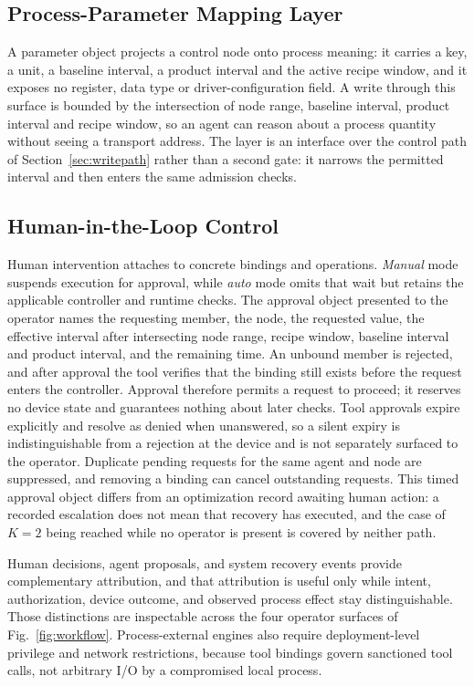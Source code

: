 \subsection{Process-Parameter Mapping Layer}
\label{sec:paramlayer}
A parameter object projects a control node onto process meaning: it carries a key, a
unit, a baseline interval, a product interval and the active recipe window, and it
exposes no register, data type or driver-configuration field. A write through this surface is bounded by the intersection of node range, baseline interval, product interval and recipe window, so an agent can
reason about a process quantity without seeing a transport address. The layer is an
interface over the control path of Section~\ref{sec:writepath} rather than a second
gate: it narrows the permitted interval and then enters the same admission checks.

\subsection{Human-in-the-Loop Control}
\label{sec:hitl}
Human intervention attaches to concrete bindings and operations. \emph{Manual} mode
suspends execution for approval, while \emph{auto} mode omits that wait but retains
the applicable controller and runtime checks. The approval object presented to the
operator names the requesting member, the node, the requested value, the effective
interval after intersecting node range, recipe window, baseline interval and
product interval, and the remaining time. An unbound member is rejected, and
after approval the tool verifies that the binding still exists before the request
enters the controller. Approval therefore permits a request to proceed; it reserves
no device state and guarantees nothing about later checks. Tool approvals expire
explicitly and resolve as denied when unanswered, so a silent expiry is
indistinguishable from a rejection at the device and is not separately surfaced to
the operator. Duplicate pending requests for the same agent and node are
suppressed, and removing a binding can cancel outstanding requests. This timed
approval object differs from an optimization record awaiting human action: a
recorded escalation does not mean that recovery has executed, and the case of $K=2$
being reached while no operator is present is covered by neither path.

Human decisions, agent proposals, and system recovery events provide complementary
attribution, and that attribution is useful only while intent, authorization,
device outcome, and observed process effect stay distinguishable. Those distinctions
are inspectable across the four operator surfaces of Fig.~\ref{fig:workflow}.
Process-external engines also require deployment-level privilege and network
restrictions, because tool bindings govern sanctioned tool calls, not arbitrary I/O
by a compromised local process.
